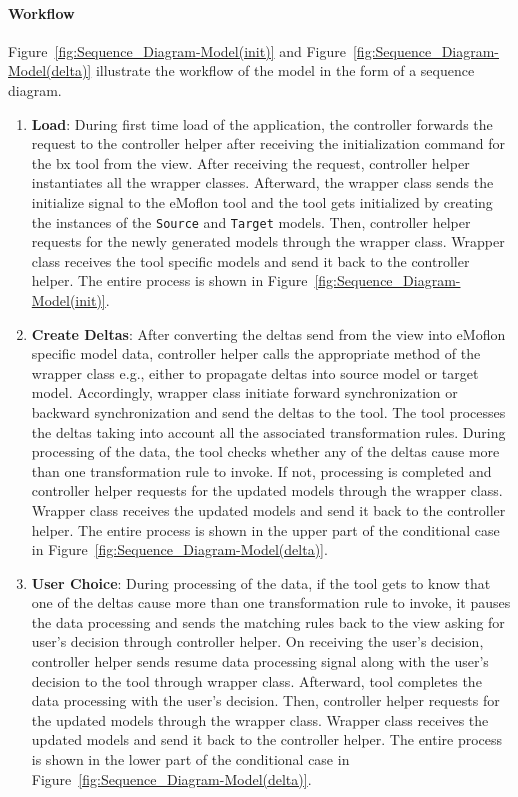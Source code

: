 \paragraph{Workflow}
Figure~\ref{fig:Sequence_Diagram-Model(init)} and  Figure~\ref{fig:Sequence_Diagram-Model(delta)} illustrate the workflow of the model in the form of a sequence diagram.

\begin{enumerate}
	\item {\textbf{Load}: During first time load of the application, the controller forwards the request to the controller helper after receiving the initialization command for the bx tool from the view. After receiving the request, controller helper instantiates all the wrapper classes. Afterward, the wrapper class sends the initialize signal to the eMoflon tool and the tool gets initialized by creating the instances of the \texttt{Source} and \texttt{Target} models. Then, controller helper requests for the newly generated models through the wrapper class. Wrapper class receives the tool specific models and send it back to the controller helper. The entire process is shown in Figure~\ref{fig:Sequence_Diagram-Model(init)}.}
	
	\item {\textbf{Create Deltas}: After converting the deltas send from the view into eMoflon specific model data, controller helper calls the appropriate method of the wrapper class e.g., either to propagate deltas into source model or target model. Accordingly, wrapper class initiate forward synchronization or backward synchronization and send the deltas to the tool. The tool processes the deltas taking into account all the associated transformation rules. During processing of the data, the tool checks whether any of the deltas cause more than one transformation rule to invoke. If not, processing is completed and controller helper requests for the updated models through the wrapper class. Wrapper class receives the updated models and send it back to the controller helper. The entire process is shown in the upper part of the conditional case in Figure~\ref{fig:Sequence_Diagram-Model(delta)}.}
	
	\item {\textbf{User Choice}: During processing of the data, if the tool gets to know that one of the deltas cause more than one transformation rule to invoke, it pauses the data processing and sends the matching rules back to the view asking for user's decision through controller helper. On receiving the user's decision, controller helper sends resume data processing signal along with the user's decision to the tool through wrapper class. Afterward, tool completes the data processing with the user's decision. Then, controller helper requests for the updated models through the wrapper class. Wrapper class receives the updated models and send it back to the controller helper. The entire process is shown in the lower part of the conditional case in Figure~\ref{fig:Sequence_Diagram-Model(delta)}.}
\end{enumerate}

